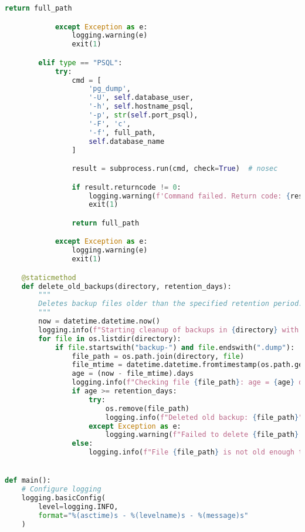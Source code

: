 \begin{lstlisting}[language=Python, caption={Python-script voor back-ups en retentiebeleid.}]
                return full_path

            except Exception as e:
                logging.warning(e)
                exit(1)

        elif type == "PSQL":
            try:
                cmd = [
                    'pg_dump',
                    '-U', self.database_user,
                    '-h', self.hostname_psql,
                    '-p', str(self.port_psql),
                    '-F', 'c',
                    '-f', full_path,
                    self.database_name
                ]

                result = subprocess.run(cmd, check=True)  # nosec

                if result.returncode != 0:
                    logging.warning(f'Command failed. Return code: {result.returncode}')
                    exit(1)

                return full_path

            except Exception as e:
                logging.warning(e)
                exit(1)

    @staticmethod
    def delete_old_backups(directory, retention_days):
        """
        Deletes backup files older than the specified retention period.
        """
        now = datetime.datetime.now()
        logging.info(f"Starting cleanup of backups in {directory} with retention period: {retention_days} days")
        for file in os.listdir(directory):
            if file.startswith("backup-") and file.endswith(".dump"):
                file_path = os.path.join(directory, file)
                file_mtime = datetime.datetime.fromtimestamp(os.path.getmtime(file_path))
                age = (now - file_mtime).days
                logging.info(f"Checking file {file_path}: age = {age} days")
                if age >= retention_days:
                    try:
                        os.remove(file_path)
                        logging.info(f"Deleted old backup: {file_path}")
                    except Exception as e:
                        logging.warning(f"Failed to delete {file_path}: {e}")
                else:
                    logging.info(f"File {file_path} is not old enough to delete (age = {age} days).")


def main():
    # Configure logging
    logging.basicConfig(
        level=logging.INFO,
        format="%(asctime)s - %(levelname)s - %(message)s"
    )


\end{lstlisting}
